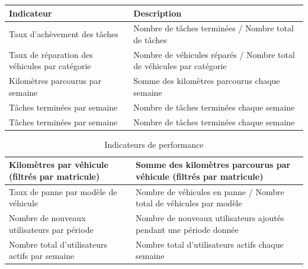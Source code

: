 \begin{table}[htbp]
    \renewcommand{\arraystretch}{1.5}
    \centering
    \begin{tabular}{|p{5cm}|p{10cm}|}
        \hline
        \textbf{Indicateur}                            & \textbf{Description}                                                  \\
        \hline
        Taux d'achèvement des tâches                   & Nombre de tâches terminées / Nombre total de tâches                   \\
        \hline
        Taux de réparation des véhicules par catégorie & Nombre de véhicules réparés / Nombre total de véhicules par catégorie
        \\
        \hline
        Kilomètres parcourus par semaine               & Somme des kilomètres parcourus chaque semaine                         \\
        \hline
        Tâches terminées par semaine                   & Nombre de tâches terminées chaque semaine                             \\
        \hline
        Tâches terminées par semaine                   & Nombre de tâches terminées chaque semaine                             \\
    \end{tabular}
\end{table}

\begin{table}[htbp]
    \renewcommand{\arraystretch}{1.6}
    \centering
    \begin{tabular}{|p{5cm}|p{10cm}|}
        Kilomètres par véhicule (filtrés par matricule) & Somme des kilomètres parcourus par véhicule (filtrés par matricule) \\
        \hline
        Taux de panne par modèle de véhicule            & Nombre de véhicules en panne / Nombre total de véhicules par modèle
        \\
        \hline
        Nombre de nouveaux utilisateurs par période     & Nombre de nouveaux utilisateurs ajoutés pendant une période donnée  \\
        \hline
        Nombre total d'utilisateurs actifs par semaine  & Nombre total d'utilisateurs actifs chaque semaine                   \\
        \hline
    \end{tabular}
    \bigskip
    \caption{Indicateurs de performance}
\end{table}



